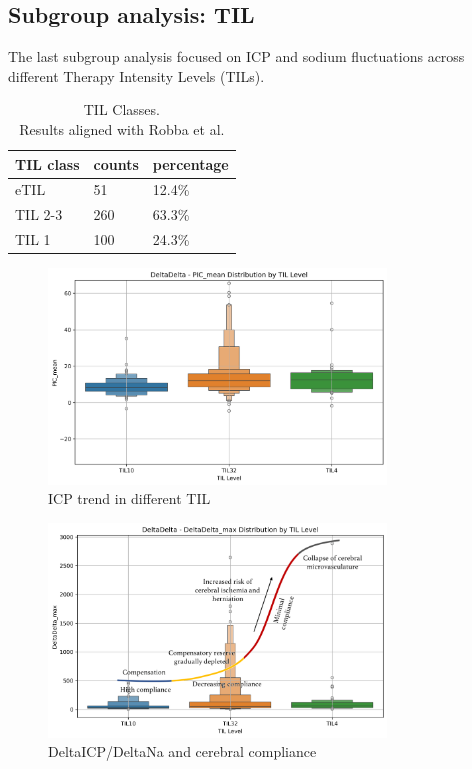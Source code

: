 \subsection{Subgroup analysis: TIL}
The last subgroup analysis focused on ICP and sodium fluctuations across different Therapy Intensity Levels (TILs). 

\begin{table}[h!]
    \centering
    \small %
    \begin{tabular}{lll}
        \hline
        \textbf{TIL class} & \textbf{counts} & \textbf{percentage} \\
        \hline
        eTIL & 51 & 12.4\% \\
        TIL 2-3 & 260 & 63.3\% \\
        TIL 1 & 100 & 24.3\% \\
        \hline
    \end{tabular}
    \caption{TIL Classes.\\\footnotesize{Results aligned with Robba et al. \cite{robbaTreatmentsIntracranialHypertension2023a}}}
    \label{tab:TILclasses}
\end{table}

\begin{figure}[h!]
    \centering
    \includegraphics[width=0.8\textwidth]{pictures/fig12_ICPTIL.png}
    \caption{ICP trend in different TIL} %
    \label{fig:ICPTIL} %
\end{figure}

\begin{figure}[h!]
    \centering
    \includegraphics[width=0.8\textwidth]{pictures/fig13_DDTIL.png}
    \caption{DeltaICP/DeltaNa and cerebral compliance} %
    \label{fig:DDTIL} %
\end{figure}


